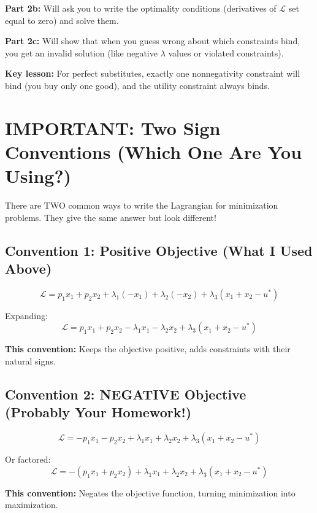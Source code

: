 \documentclass[11pt]{article}
\begin{document}
\textbf{Part 2b:} Will ask you to write the optimality conditions (derivatives of $\mathcal{L}$ set equal to zero) and solve them.

\textbf{Part 2c:} Will show that when you guess wrong about which constraints bind, you get an invalid solution (like negative $\lambda$ values or violated constraints).

\textbf{Key lesson:} For perfect substitutes, exactly one nonnegativity constraint will bind (you buy only one good), and the utility constraint always binds.

\section{IMPORTANT: Two Sign Conventions (Which One Are You Using?)}

There are TWO common ways to write the Lagrangian for minimization problems. They give the same answer but look different!

\subsection{Convention 1: Positive Objective (What I Used Above)}

\begin{equation}
\mathcal{L} = p_1 x_1 + p_2 x_2 + \lambda_1(-x_1) + \lambda_2(-x_2) + \lambda_3(x_1 + x_2 - u^*)
\end{equation}

Expanding:
$$\mathcal{L} = p_1 x_1 + p_2 x_2 - \lambda_1 x_1 - \lambda_2 x_2 + \lambda_3(x_1 + x_2 - u^*)$$

\textbf{This convention:} Keeps the objective positive, adds constraints with their natural signs.

\subsection{Convention 2: NEGATIVE Objective (Probably Your Homework!)}

\begin{equation}
\mathcal{L} = -p_1 x_1 - p_2 x_2 + \lambda_1 x_1 + \lambda_2 x_2 + \lambda_3(x_1 + x_2 - u^*)
\end{equation}

Or factored:
$$\mathcal{L} = -(p_1 x_1 + p_2 x_2) + \lambda_1 x_1 + \lambda_2 x_2 + \lambda_3(x_1 + x_2 - u^*)$$

\textbf{This convention:} Negates the objective function, turning minimization into maximization.
\end{document}
